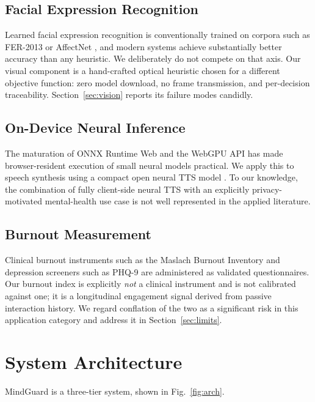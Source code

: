 \documentclass[conference]{IEEEtran}
\begin{document}
\subsection{Facial Expression Recognition}
Learned facial expression recognition is conventionally trained on corpora such
as FER-2013 \cite{fer2013} or AffectNet \cite{affectnet}, and modern systems
achieve substantially better accuracy than any heuristic. We deliberately do
not compete on that axis. Our visual component is a hand-crafted optical
heuristic chosen for a different objective function: zero model download, no
frame transmission, and per-decision traceability. Section~\ref{sec:vision}
reports its failure modes candidly.

\subsection{On-Device Neural Inference}
The maturation of ONNX Runtime Web \cite{onnxweb} and the WebGPU API
\cite{webgpu} has made browser-resident execution of small neural models
practical. We apply this to speech synthesis using a compact open neural TTS
model \cite{kokoro}. To our knowledge, the combination of fully client-side
neural TTS with an explicitly privacy-motivated mental-health use case is not
well represented in the applied literature.

\subsection{Burnout Measurement}
Clinical burnout instruments such as the Maslach Burnout Inventory
\cite{maslach} and depression screeners such as PHQ-9 \cite{phq9} are
administered as validated questionnaires. Our burnout index is explicitly
\emph{not} a clinical instrument and is not calibrated against one; it is a
longitudinal engagement signal derived from passive interaction history. We
regard conflation of the two as a significant risk in this application
category and address it in Section~\ref{sec:limits}.

\section{System Architecture}

MindGuard is a three-tier system, shown in Fig.~\ref{fig:arch}.
\end{document}
